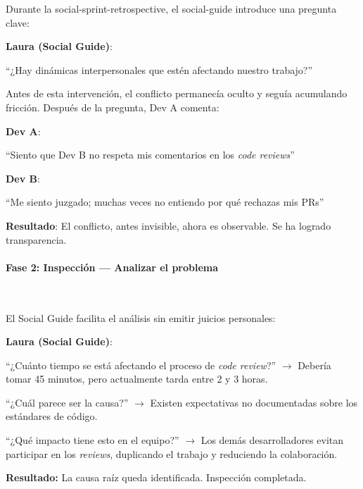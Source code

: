 \begin{escenario}
    Durante la \gls{social-sprint-retrospective}, el \gls{social-guide} introduce una pregunta clave:

    \textbf{Laura (Social Guide)}:
    \begin{dialogo}
        ``¿Hay dinámicas interpersonales que estén afectando nuestro trabajo?''
    \end{dialogo}

    Antes de esta intervención, el conflicto permanecía oculto y seguía acumulando fricción.
    Después de la pregunta, Dev A comenta:

    \textbf{Dev A}:
    \begin{dialogo}
        ``Siento que Dev B no respeta mis comentarios en los \textit{code reviews}''
    \end{dialogo}

    \textbf{Dev B}:
    \begin{dialogo}
        ``Me siento juzgado; muchas veces no entiendo por qué rechazas mis PRs''
    \end{dialogo}

    \textbf{Resultado}: El conflicto, antes invisible, ahora es observable. Se ha logrado transparencia.

\end{escenario}

\paragraph{Fase 2: Inspección — Analizar el problema}\mbox{}\\[-0.3\baselineskip]

\begin{escenario}
    El Social Guide facilita el análisis sin emitir juicios personales:

    \textbf{Laura (Social Guide)}:
    \begin{dialogo}
        ``¿Cuánto tiempo se está afectando el proceso de \textit{code review}?''  $\rightarrow$ Debería tomar 45 minutos, pero actualmente tarda entre 2 y 3 horas.

        ``¿Cuál parece ser la causa?'' $\rightarrow$ Existen expectativas no documentadas sobre los estándares de código.

        ``¿Qué impacto tiene esto en el equipo?'' $\rightarrow$ Los demás desarrolladores evitan participar en los \textit{reviews}, duplicando el trabajo y reduciendo la colaboración.

    \end{dialogo}
    \textbf{Resultado:} La causa raíz queda identificada. Inspección completada.
\end{escenario}

